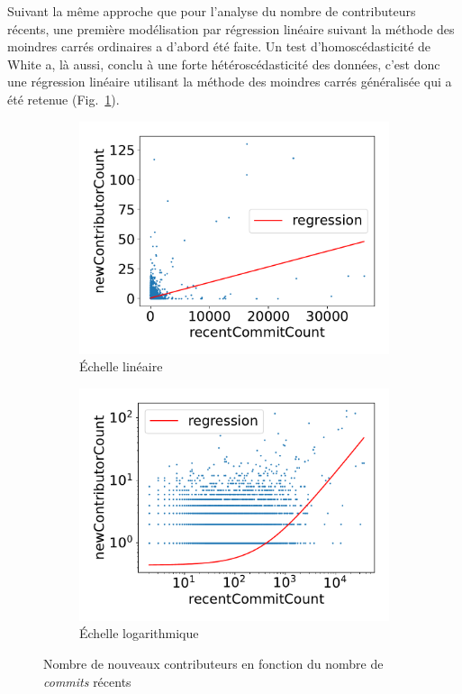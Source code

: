 \documentclass[dvipsnames,runningheads]{llncs}
\begin{document}
    Suivant la même approche que pour l'analyse du nombre de contributeurs récents, une première modélisation
    par régression linéaire suivant la méthode des moindres carrés ordinaires a d'abord été faite. Un test
    d'homoscédasticité de White a, là aussi, conclu à une forte hétéroscédasticité des données, c'est donc une
    régression linéaire utilisant la méthode des moindres carrés généralisée qui a été retenue
    (Fig.~\ref{fig:commitCount}).

    \begin{figure}[ht]
        \centering
        \begin{subfigure}[t]{0.5\textwidth}
            \includegraphics[width=\textwidth]{../experiment/data_analysis/recentCommitCountRegression_linearScale}
            \caption{Échelle linéaire}
        \end{subfigure}%
        \begin{subfigure}[t]{0.5\textwidth}
            \includegraphics[width=\textwidth]{../experiment/data_analysis/recentCommitCountRegression_logScale}
            \caption{Échelle logarithmique}
        \end{subfigure}

        \caption{Nombre de nouveaux contributeurs en fonction du nombre de \emph{commits} récents}
        \label{fig:commitCount}
    \end{figure}
\end{document}
